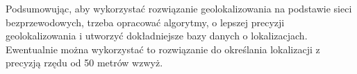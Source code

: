 Podsumowując, aby wykorzystać rozwiązanie geolokalizowania na podstawie sieci bezprzewodowych, trzeba opracować algorytmy, o lepszej precyzji geolokalizowania i utworzyć dokładniejsze bazy danych o lokalizacjach. Ewentualnie można wykorzystać to rozwiązanie do określania lokalizacji z precyzją rzędu od 50 metrów wzwyż.
